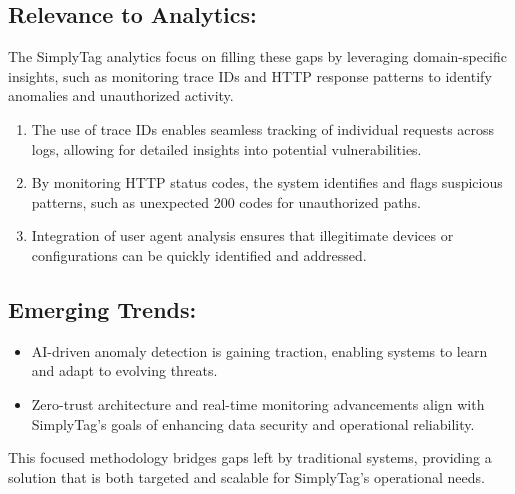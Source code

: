 \subsection{Relevance to Analytics:}

The SimplyTag analytics focus on filling these gaps by leveraging domain-specific insights, such as monitoring trace IDs and HTTP response patterns to identify anomalies and unauthorized activity.

\begin{enumerate}
	\item The use of trace IDs enables seamless tracking of individual requests across logs, allowing for detailed insights into potential vulnerabilities.
	\item By monitoring HTTP status codes, the system identifies and flags suspicious patterns, such as unexpected 200 codes for unauthorized paths.
	\item Integration of user agent analysis ensures that illegitimate devices or configurations can be quickly identified and addressed.
\end{enumerate}

\subsection{Emerging Trends:}
\begin{itemize}
	\item AI-driven anomaly detection is gaining traction, enabling systems to learn and adapt to evolving threats.
	\item Zero-trust architecture and real-time monitoring advancements align with SimplyTag’s goals of enhancing data security and operational reliability.
\end{itemize}

This focused methodology bridges gaps left by traditional systems, providing a solution that is both targeted and scalable for SimplyTag’s operational needs.
